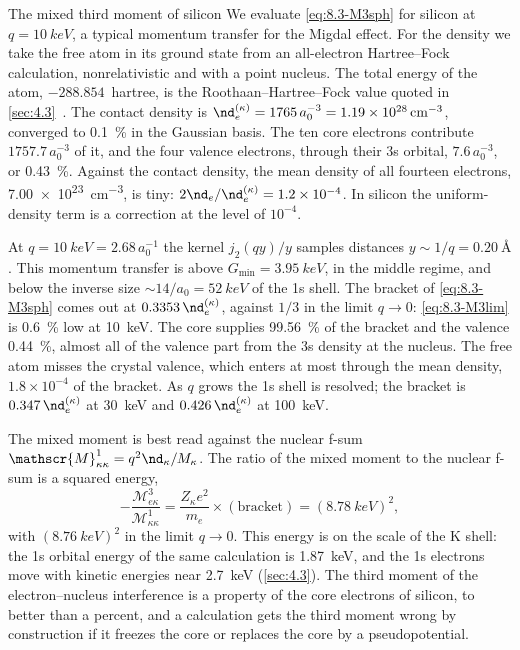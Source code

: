\begin{workedexample}{The mixed third moment of silicon}\label{we:8-third}
We evaluate \cref{eq:8.3-M3sph} for silicon at $q = \SI{10}{keV}$, a typical momentum transfer for the Migdal effect. For the density we take the free atom in its ground state from an all-electron Hartree--Fock calculation, nonrelativistic and with a point nucleus. The total energy of the atom, $-288.854$~hartree, is the Roothaan--Hartree--Fock value quoted in \cref{sec:4.3}~\cite{bunge1993roothaan}. The contact density is $\nd_e^{(\kappa)} = 1765\,a_0^{-3} = \SI{1.19e28}{cm^{-3}}$, converged to \SI{0.1}{\percent} in the Gaussian basis. The ten core electrons contribute $1757.7\,a_0^{-3}$ of it, and the four valence electrons, through their 3s orbital, $7.6\,a_0^{-3}$, or \SI{0.43}{\percent}. Against the contact density, the mean density of all fourteen electrons, \SI{7.00e23}{cm^{-3}}, is tiny: $2\nd_e/\nd_e^{(\kappa)} = 1.2\times10^{-4}$. In silicon the uniform-density term is a correction at the level of $10^{-4}$.

At $q = \SI{10}{keV} = 2.68\,a_0^{-1}$ the kernel $j_2(qy)/y$ samples distances $y \sim 1/q = \SI{0.20}{\angstrom}$. This momentum transfer is above $G_{\mathrm{min}} = \SI{3.95}{keV}$, in the middle regime, and below the inverse size $\sim 14/a_0 = \SI{52}{keV}$ of the 1s shell. The bracket of \cref{eq:8.3-M3sph} comes out at $0.3353\,\nd_e^{(\kappa)}$, against $1/3$ in the limit $q \to 0$: \cref{eq:8.3-M3lim} is \SI{0.6}{\percent} low at \SI{10}{keV}. The core supplies \SI{99.56}{\percent} of the bracket and the valence \SI{0.44}{\percent}, almost all of the valence part from the 3s density at the nucleus. The free atom misses the crystal valence, which enters at most through the mean density, $1.8\times10^{-4}$ of the bracket. As $q$ grows the 1s shell is resolved; the bracket is $0.347\,\nd_e^{(\kappa)}$ at \SI{30}{keV} and $0.426\,\nd_e^{(\kappa)}$ at \SI{100}{keV}.

The mixed moment is best read against the nuclear f-sum $\mathscr{M}^1_{\kappa\kappa} = q^2\nd_\kappa/M_\kappa$. The ratio of the mixed moment to the nuclear f-sum is a squared energy,
\begin{equation*}
  -\frac{\mathscr{M}^3_{e\kappa}}{\mathscr{M}^1_{\kappa\kappa}} = \frac{Z_\kappa e^2}{m_e}\times(\text{bracket}) = (\SI{8.78}{keV})^2 ,
\end{equation*}
with $(\SI{8.76}{keV})^2$ in the limit $q \to 0$. This energy is on the scale of the K shell: the 1s orbital energy of the same calculation is \SI{1.87}{keV}, and the 1s electrons move with kinetic energies near \SI{2.7}{keV} (\cref{sec:4.3}). The third moment of the electron--nucleus interference is a property of the core electrons of silicon, to better than a percent, and a calculation gets the third moment wrong by construction if it freezes the core or replaces the core by a pseudopotential.
\end{workedexample}

